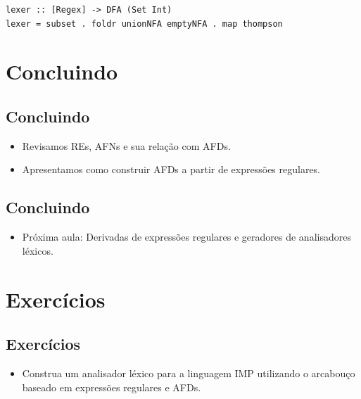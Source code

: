 \documentclass[11pt]{article}
\begin{document}
\begin{verbatim}
lexer :: [Regex] -> DFA (Set Int)
lexer = subset . foldr unionNFA emptyNFA . map thompson
\end{verbatim}
\section*{Concluindo}
\label{sec:orge9bc5f1}

\subsection*{Concluindo}
\label{sec:orge4eb9df}

\begin{itemize}
\item Revisamos REs, AFNs e sua relação com AFDs.

\item Apresentamos como construir AFDs a partir de expressões regulares.
\end{itemize}
\subsection*{Concluindo}
\label{sec:org1da90ca}

\begin{itemize}
\item Próxima aula: Derivadas de expressões regulares e geradores de analisadores léxicos.
\end{itemize}
\section*{Exercícios}
\label{sec:org631b480}

\subsection*{Exercícios}
\label{sec:org8519d39}

\begin{itemize}
\item Construa um analisador léxico para a linguagem IMP utilizando o arcabouço baseado
em expressões regulares e AFDs.
\end{itemize}
\end{document}

